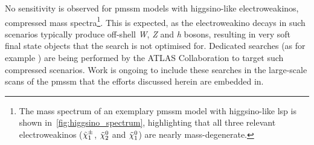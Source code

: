 No sensitivity is observed for \gls{pmssm} models with higgsino-like electroweakinos, \ie compressed mass spectra\footnote{The mass spectrum of an exemplary \gls{pmssm} model with higgsino-like \gls{lsp} is shown in~\cref{fig:higgsino_spectrum}, highlighting that all three relevant electroweakinos ($\tilde{\chi}_1^\pm$, $\tilde{\chi}_2^0$ and $\tilde{\chi}_1^0$) are nearly mass-degenerate.}. This is expected, as the electroweakino decays in such scenarios typically produce off-shell \textit{W}, \textit{Z} and \textit{h} bosons, resulting in very soft final state objects that the \onelepton search is not optimised for. Dedicated searches (as for example \cite{SUSY-2018-16}) are being performed by the ATLAS Collaboration to target such compressed scenarios. Work is ongoing to include these searches in the large-scale scans of the \gls{pmssm} that the efforts discussed herein are embedded in.

